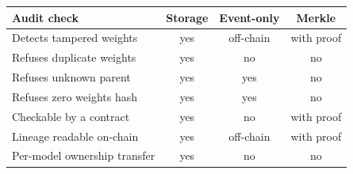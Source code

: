 \setlength{\tabcolsep}{4pt}%
\begin{tabular}{lccc}
\toprule
Audit check & Storage & Event-only & Merkle \\
\midrule
Detects tampered weights & yes & off-chain & with proof \\
Refuses duplicate weights & yes & no & no \\
Refuses unknown parent & yes & yes & no \\
Refuses zero weights hash & yes & yes & no \\
Checkable by a contract & yes & no & with proof \\
Lineage readable on-chain & yes & off-chain & with proof \\
Per-model ownership transfer & yes & no & no \\
\bottomrule
\end{tabular}
